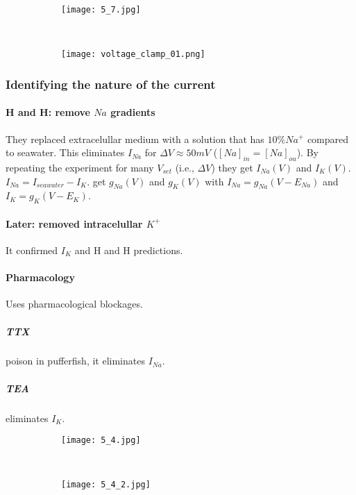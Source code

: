 \documentclass[main]{subfiles}
\begin{document}
\begin{figure}[H]
	\centering
	\begin{subfigure}[b]{0.5\textwidth}
    	\centering
		\texttt{[image: 5\_7.jpg]}
	\end{subfigure}%
	~
	\begin{subfigure}[b]{0.4\textwidth}
		\centering
		\texttt{[image: voltage\_clamp\_01.png]}
	\end{subfigure}
\end{figure}

\subsubsection{Identifying the nature of the current}

\paragraph{H and H: remove $Na$ gradients}
They replaced extracelullar medium with a solution that has $10\% Na^+ $ compared to seawater. This eliminates $I_{Na}$ for $\Delta V \approx 50 mV $  ($[Na]_{in} = [Na]_{ou}$).
By repeating the experiment for many $V_{set}$ (i.e., $\Delta V$) they get $I_{Na}(V)$ and $I_K(V)$.
$I_{Na} = I_{seawater} - I_K$.
get $g_{Na}(V)$ and $g_K(V)$ with $I_{Na} = g_{Na}(V - E_{Na})$ and $I_K = g_K (V - E_K)$.

\paragraph{Later: removed intracelullar $K^+$} It confirmed $I_K$ and H and H predictions.

\paragraph{Pharmacology} Uses pharmacological blockages.
\subparagraph{TTX} poison in pufferfish, it eliminates $I_{Na}$.
\subparagraph{TEA} eliminates $I_K$.

\begin{figure}[H]
	\centering
	\begin{subfigure}[b]{0.65\textwidth}
    	\centering
		\texttt{[image: 5\_4.jpg]}
	\end{subfigure}%
	~
	\begin{subfigure}[b]{0.35\textwidth}
		\centering
		\texttt{[image: 5\_4\_2.jpg]}
	\end{subfigure}
\end{figure}
\end{document}
